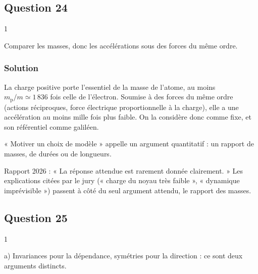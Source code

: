 \documentclass[11pt,a4paper]{article}
\begin{document}
\hypertarget{question-24}{%
\subsection{Question 24}\label{question-24}}

\begin{indication}{1}

Comparer les masses, donc les accélérations sous des forces du même ordre.

\end{indication}

\hypertarget{solution-23}{%
\subsubsection{Solution}\label{solution-23}}

La charge positive porte l'essentiel de la masse de l'atome, au moins \(m_{\text{p}}/m\simeq1\,836\) fois celle de l'électron. Soumise à des forces du même ordre (actions réciproques, force électrique proportionnelle à la charge), elle a une accélération au moins mille fois plus faible. On la considère donc comme fixe, et son référentiel comme galiléen.

\begin{methode}

« Motiver un choix de modèle » appelle un argument quantitatif : un rapport de masses, de durées ou de longueurs.

\end{methode}

\begin{jury}

Rapport 2026 : « La réponse attendue est rarement donnée clairement. » Les explications citées par le jury (« charge du noyau très faible », « dynamique imprévisible ») passent à côté du seul argument attendu, le rapport des masses.

\end{jury}

\hypertarget{question-25}{%
\subsection{Question 25}\label{question-25}}

\begin{indication}{1}

a) Invariances pour la dépendance, symétries pour la direction : ce sont deux arguments distincts.

\end{indication}
\end{document}

